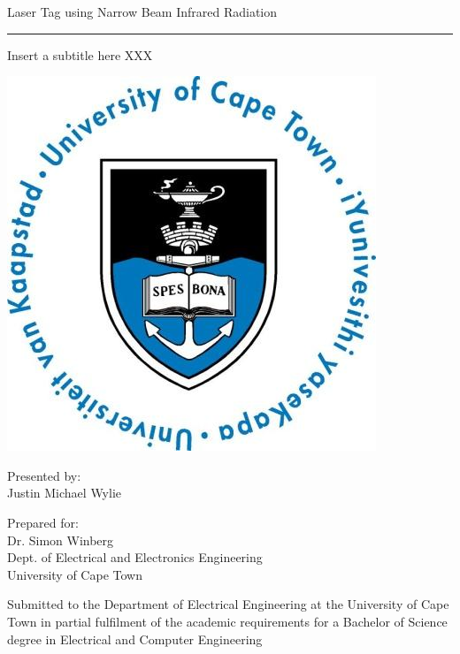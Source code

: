 \documentclass[a4paper,12pt]{report}
\begin{document}
\thispagestyle{empty}
{\Huge \begin{center}
Laser Tag using Narrow Beam Infrared Radiation
\hrule 
{\Large Insert a subtitle here XXX}
\end{center}}

\vskip 5mm
\begin{center}
\- \- \- \- \- \- \- \- \- \-\includegraphics[scale = 0.3]{figures/template/uctLogo.png}
\end{center}

\vskip 5mm
\begin{center}
Presented by:\\
Justin Michael Wylie		%
\end{center}

\vskip 10mm
\begin{center}
Prepared for:\\
Dr. Simon Winberg\\ 		%
Dept. of Electrical and Electronics Engineering\\University of Cape Town
\end{center}


\vskip 10mm
\begin{center}
Submitted to the Department of Electrical Engineering at the University of Cape Town in partial
fulfilment of the academic requirements for a Bachelor of Science degree in Electrical and Computer Engineering

\end{center}
\end{document}
